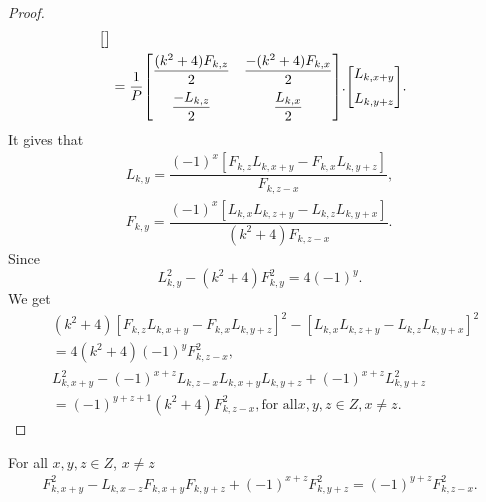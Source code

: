\begin{proof}
\begin{align*}
{\begin{bmatrix}{}
	\end{bmatrix}
	}\\
	&=\dfrac{1}{P}{
 \begin{bmatrix}{}
    \dfrac{(k^2+4)F_{k,z}}{2} & \dfrac{-(k^2+4)F_{k,x}}{2}\vspace{.2cm} \\
    \dfrac{-L_{k,z}}{2} & \dfrac{L_{k,x}}{2} \\
	\end{bmatrix}
	}.{
 \begin{bmatrix}{}
    L_{k,x+y}\vspace{.2cm} \\
    L_{k,y+z} \\
	\end{bmatrix}
	}.
	\end{align*}
	It gives that
	\begin{align*}
	L_{k,y}=\dfrac{(-1)^x[F_{k,z}L_{k,x+y}-F_{k,x}L_{k,y+z}]}{F_{k,z-x}},\\
	F_{k,y}=\dfrac{(-1)^x[L_{k,x}L_{k,z+y}-L_{k,z}L_{k,y+x}]}{(k^2+4)F_{k,z-x}}.
	\end{align*}
Since
$$L^2_{k,y}-(k^2+4)F^2_{k,y}=4(-1)^y.$$
We get
\begin{align*}
&(k^2+4)[F_{k,z}L_{k,x+y}-F_{k,x}L_{k,y+z}]^2-[L_{k,x}L_{k,z+y}-L_{k,z}L_{k,y+x}]^2\\&=4(k^2+4)(-1)^yF^2_{k,z-x},\\
&L^2_{k,x+y}-(-1)^{x+z}L_{k,z-x}L_{k,x+y}L_{k,y+z}+(-1)^{x+z}L^2_{k,y+z}\\&=(-1)^{y+z+1}(k^2+4)F^2_{k,z-x}, \text{for all} x,y,z\in Z ,x\neq z.
\end{align*}
\end{proof}
\begin{theorem}For all $x,y,z\in Z $, $x\neq z$
\begin{align*}
F^2_{k,x+y}-L_{k,x-z}F_{k,x+y}F_{k,y+z}+(-1)^{x+z}F^2_{k,y+z}=(-1)^{y+z}F^2_{k,z-x}. 
\end{align*}
\end{theorem}
